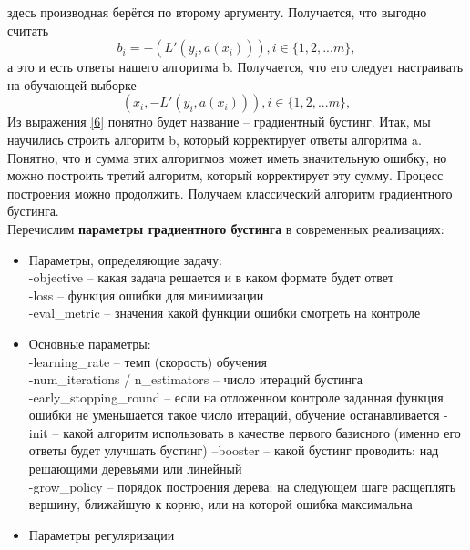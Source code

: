 здесь производная берётся по второму аргументу. Получается, что выгодно считать
\begin{equation}\label{5}
    b_i = -(L'(y_i, a(x_i))), i \in \{1,2,...m\},
\end{equation}
а это и есть ответы нашего алгоритма b. Получается, что его следует настраивать на обучающей выборке 
\begin{equation}\label{6}
   (x_i, -L'(y_i, a(x_i))), i \in \{1,2,...m\},
\end{equation}
Из выражения \ref{6} понятно будет название – градиентный бустинг. 
Итак, мы научились строить алгоритм b, который корректирует ответы алгоритма a. Понятно, что и сумма этих алгоритмов может иметь значительную ошибку, но можно построить третий алгоритм, который корректирует эту сумму. Процесс построения можно продолжить. Получаем классический алгоритм градиентного бустинга. \\


Перечислим \textbf{параметры градиентного бустинга} в современных реализациях:
\begin{itemize}
    \item Параметры, определяющие задачу: \\
        -objective – какая задача решается и в каком формате будет ответ \\
        -loss – функция ошибки для минимизации \\
        -eval\_metric – значения какой функции ошибки смотреть на контроле \\
    \item Основные параметры: \\
    -learning\_rate – темп (скорость) обучения \\
    -num\_iterations / n\_estimators  – число итераций бустинга \\
    -early\_stopping\_round  –  если на отложенном контроле заданная функция ошибки не уменьшается такое число итераций, обучение останавливается
    -init – какой алгоритм использовать в качестве первого базисного (именно его ответы будет улучшать бустинг)
    --booster – какой бустинг проводить: над решающими деревьями или линейный \\
    -grow\_policy – порядок построения дерева: на следующем шаге расщеплять вершину, ближайшую к корню, или на которой ошибка максимальна\\
    \item Параметры регуляризации
    
    
\end{itemize}


